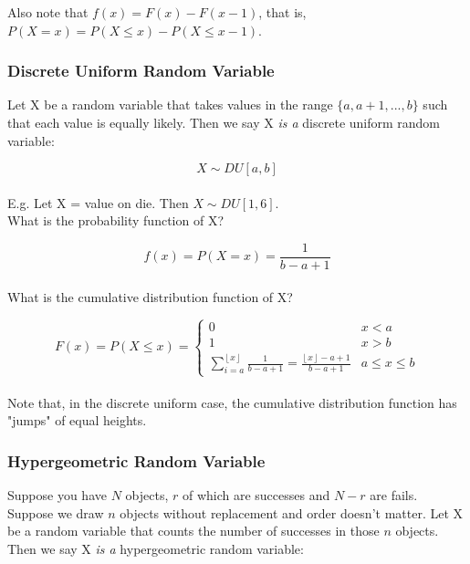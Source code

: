\documentclass[12pt, letterpaper]{article}
\begin{document}
Also note that \(f\left(x\right) = F\left(x\right) - F\left(x - 1\right)\), that is, \(P\left(X = x\right) = P\left(X \leq x \right) - P\left(X \leq x - 1\right)\). 

\subsubsection{Discrete Uniform Random Variable}
Let X be a random variable that takes values in the range \(\{a, a + 1, ..., b\}\) such that each value is equally likely. Then we say X \emph{is a} discrete uniform random variable:

\begin{equation}
X \sim DU[a, b]
\end{equation}\\

E.g. Let X = value on die. Then \(X \sim DU[1, 6]\).\\

What is the probability function of X?

\begin{equation}
f\left(x\right) = P\left(X = x\right) = \frac{1}{b - a + 1}
\end{equation}\\

What is the cumulative distribution function of X?

\begin{equation}
F\left(x\right) = P\left(X \leq x\right) = 
	\begin{cases} 
      0 & x < a \\
      1 & x > b \\
      \sum\limits_{i = a}^{\left \lfloor{x}\right \rfloor} \frac{1}{b - a + 1} = \frac{\left \lfloor{x}\right \rfloor - a + 1}{b - a + 1} & a \leq x \leq b
	\end{cases}
\end{equation}\\

Note that, in the discrete uniform case, the cumulative distribution function has "jumps" of equal heights.

\subsubsection{Hypergeometric Random Variable}
Suppose you have \(N\) objects, \(r\) of which are successes and \(N - r\) are fails. Suppose we draw \(n\) objects without replacement and order doesn't matter. Let X be a random variable that counts the number of successes in those \(n\) objects. Then we say X \emph{is a} hypergeometric random variable:
\end{document}
